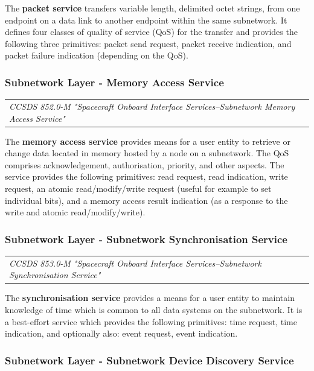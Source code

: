 The \textbf{packet service} transfers variable length, delimited octet strings, from one endpoint on a data link to another endpoint within the same subnetwork. It defines four classes of quality of service (QoS) for the transfer and provides the following three primitives: packet send request, packet receive indication, and packet failure indication (depending on the QoS).

\subsubsection{Subnetwork Layer - Memory Access Service}

\begin{tabular}{l}
\textit{CCSDS 852.0-M "Spacecraft Onboard Interface Services--Subnetwork Memory Access Service" \cite{CCSDS 852.0-M}} 
\end{tabular}

The \textbf{memory access service} provides means for a user entity to retrieve or change data located in memory hosted by a node on a subnetwork. The QoS comprises acknowledgement, authorisation, priority, and other aspects. The service provides the following primitives: read request, read indication, write request, an atomic read/modify/write request (useful for example to set individual bits), and a memory access result indication (as a response to the write and atomic read/modify/write).

\subsubsection{Subnetwork Layer - Subnetwork Synchronisation Service}

\begin{tabular}{l}
\textit{CCSDS 853.0-M "Spacecraft Onboard Interface Services--Subnetwork Synchronisation Service" \cite{CCSDS 853.0-M}} 
\end{tabular}

The \textbf{synchronisation service} provides a means for a user entity to maintain knowledge of time which is common to all data systems on the subnetwork. It is a best-effort service which provides the following primitives: time request, time indication, and optionally also: event request, event indication.

\subsubsection{Subnetwork Layer - Subnetwork Device Discovery Service}

